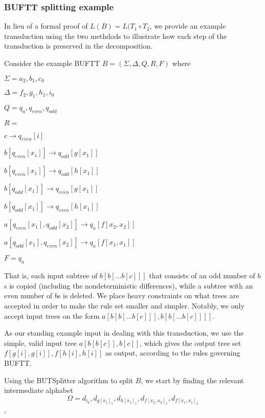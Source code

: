 \subsubsection{BUFTT splitting example}

In lieu of a formal proof of $L(B) = L(T_1 \circ T_2$, we provide an
example transduction using the two methdods to illustrate how each step of
the transduction is preserved in the decomposition.

Consider the example BUFTT $B = (\Sigma, \Delta, Q, R, F)$ where
\begin{compactitem}
\item $\Sigma = {a_2, b_1, c_0}$ 
\item $\Delta = {f_2, g_1, h_1, i_0}$ 
\item $Q = {q_a, q_{even}, q_{odd}}$ 
\item $R = $
\begin{compactitem}
\item $c \rightarrow q_{even}[i]$
\item $b[q_{even}[x_1]] \rightarrow q_{odd}[g[x_1]]$
\item $b[q_{even}[x_1]] \rightarrow q_{odd}[h[x_1]]$
\item $b[q_{odd}[x_1]] \rightarrow q_{even}[g[x_1]]$
\item $b[q_{odd}[x_1]] \rightarrow q_{even}[h[x_1]]$
\item $a[q_{even}[x_1],q_{odd}[x_2]] \rightarrow q_a[f[x_2,x_2]]$
\item $a[q_{odd}[x_1],q_{even}[x_2]] \rightarrow q_a[f[x_1,x_1]] $
\end{compactitem}
\item $F = {q_a}$
\end{compactitem}

That is, each input subtree of $b[b[\ldots b[c]]]$ that consists of an odd
number of $b$s is copied (including the nondeterministic differences),
while a subtree with an even number of $b$s is deleted. We place heavy
constraints on what trees are accepted in order to make the rule set
smaller and simpler. Notably, we only accept input trees on the form
$a[b[b[\ldots b[c]]],b[b[\ldots b[c]]]]$.

As our standing example input in dealing with this transduction, we use the
simple, valid input tree $a[b[b[c]],b[c]]$, which gives the output tree set
${f[g[i],g[i]], f[h[i],h[i]]}$ as output, according to the rules governing
BUFTT.

Using the BUTSplitter algorithm to split $B$, we start by finding the
relevant intermediate alphabet 
$$\Omega={d_{i}_0, d_{g[x_1]}_1, d_{h[x_1]}_1, d_{f[x_2,x_2]}_1, d_{f[x_1,x_1]}_1}$$,

